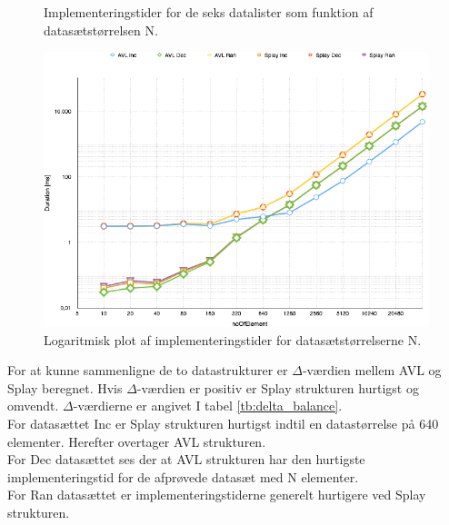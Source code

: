 \begin{figure}[th!]
\centering
{}
\captionsetup{type=table}
\caption{Implementeringstider for de seks datalister som funktion af datasætstørrelsen N.}
\label{tb:balance}
\end{figure}
\begin{figure}[th!]
\centering
\includegraphics[width=.8\textwidth]{./graphics/balance}
\caption{Logaritmisk plot af implementeringstider for datasætstørrelserne N.}
\label{fig:balance}
\end{figure}

For at kunne sammenligne de to datastrukturer er \(\Delta\)-værdien mellem AVL og Splay beregnet. Hvis \(\Delta\)-værdien er positiv er Splay strukturen hurtigst og omvendt. \(\Delta\)-værdierne er angivet I tabel \ref{tb:delta_balance}. \\
For datasættet Inc er Splay strukturen hurtigst indtil en datastørrelse på 640 elementer. Herefter overtager AVL strukturen.\\
For Dec datasættet ses der at AVL strukturen har den hurtigste implementeringstid for de afprøvede datasæt med N elementer. \\
For Ran datasættet er implementeringstiderne generelt hurtigere ved Splay strukturen.

